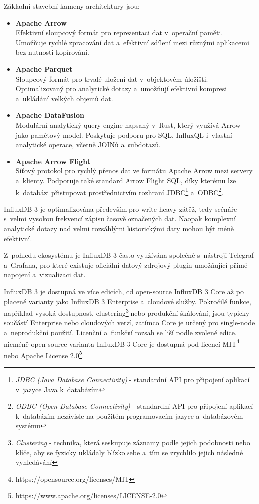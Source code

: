 Základní stavební kameny architektury jsou:

\begin{itemize}
    \item \textbf{Apache Arrow} \\
    Efektivní sloupcový formát pro reprezentaci dat v~operační paměti. Umožňuje rychlé zpracování dat a~efektivní sdílení mezi různými aplikacemi bez nutnosti kopírování. \cite{influxdbdocs}
    \item \textbf{Apache Parquet} \\
    Sloupcový formát pro trvalé uložení dat v~objektovém úložišti. Optimalizovaný pro analytické dotazy a~umožňují efektivní kompresi a~ukládání velkých objemů dat. \cite{apacheparquet}
    \item \textbf{Apache DataFusion} \\
    Modulární analytický query engine napsaný v~Rust, který využívá Arrow jako paměťový model. Poskytuje podporu pro SQL, InfluxQL i~vlastní analytické operace, včetně JOINů a~subdotazů. \cite{influxdbdocs}
    \item \textbf{Apache Arrow Flight} \\
    Síťový protokol pro rychlý přenos dat ve formátu Apache Arrow mezi servery a~klienty. Podporuje také standard Arrow Flight SQL, díky kterému lze k~databázi přistupovat prostřednictvím rozhraní JDBC\footnote{\textit{JDBC (Java Database Connectivity)} - standardní API pro připojení aplikací v~jazyce Java k~databázím} a~ODBC\footnote{\textit{ODBC (Open Database Connectivity)} - standardní API pro připojení aplikací k~databázím nezávisle na použitém programovacím jazyce a~databázovém systému}. 
    \cite{influxdbdocs}
\end{itemize}

InfluxDB 3 je optimalizována především pro write-heavy zátěž, tedy scénáře s~velmi vysokou frekvencí zápisu časově označených dat. 
Naopak komplexní analytické dotazy nad velmi rozsáhlými historickými daty mohou být méně efektivní.

Z~pohledu ekosystému je InfluxDB 3 často využívána společně s~nástroji Telegraf a~Grafana, pro které existuje oficiální datový zdrojový plugin umožňující přímé napojení a~vizualizaci dat.

InfluxDB 3 je dostupná ve více edicích, od open-source InfluxDB 3 Core až po placené varianty jako InfluxDB 3 Enterprise a~cloudové služby. 
Pokročilé funkce, například vysoká dostupnost, clustering\footnote{\textit{Clustering} - technika, která seskupuje záznamy podle jejich podobnosti nebo klíče, aby se fyzicky ukládaly blízko sebe a~tím se zrychlilo jejich následné vyhledávání} nebo produkční škálování, jsou typicky součástí Enterprise nebo cloudových verzí, zatímco Core je určený pro single-node a~neprodukční použití. 
Licenční a~funkční rozsah se liší podle zvolené edice, nicméně open-source varianta InfluxDB 3 Core je dostupná pod licencí MIT\footnote{https://opensource.org/licenses/MIT} nebo Apache License 2.0\footnote{https://www.apache.org/licenses/LICENSE-2.0}.

